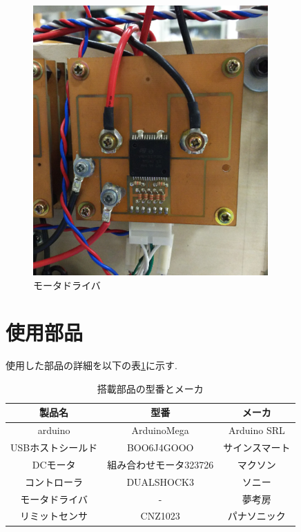 \begin{figure}[!htbp]
  \begin{center}
    \includegraphics[width=90mm]{img/motordrive.JPG}
    \end{center}
  \caption{モータドライバ}
 \label{fig:motordrive}
\end{figure}

\section{使用部品}
使用した部品の詳細を以下の表\ref{tab:parts}に示す.

\begin{table}[!htb]
 \begin{center}
  \caption{搭載部品の型番とメーカ}
  \begin{tabular}[htbp]{|c|c|c|}
   \hline
   製品名&型番&メーカ \\
   \hline
   arduino&ArduinoMega&Arduino SRL\\
   \hline
   USBホストシールド&BOO6J4GOOO&サインスマート\\
   \hline
   DCモータ&組み合わせモータ323726&マクソン\\
   \hline
   コントローラ&DUALSHOCK3&ソニー\\
   \hline
   モータドライバ&-&夢考房\\
   \hline
   リミットセンサ&CNZ1023&パナソニック\\
   \hline
  \end{tabular}
  \label{tab:parts}
 \end{center}
\end{table}